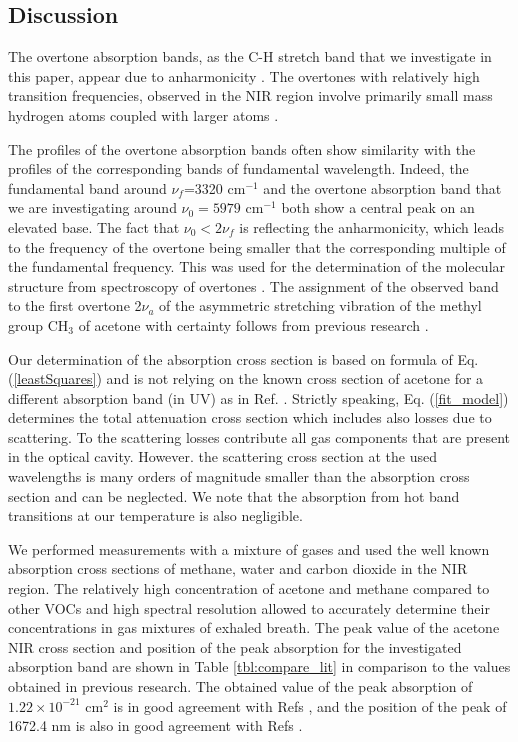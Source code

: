 \documentclass[8pt,a4paper]{report}
\begin{document}
	\subsection{Discussion}
	The overtone absorption bands, as the C-H stretch band that we investigate in this paper, appear due to anharmonicity \cite{Sandorfy_1978}. The overtones with relatively high transition frequencies, observed in the NIR region involve primarily small mass hydrogen atoms coupled with larger atoms \cite{Weyer_2006}.
	
	The profiles of the overtone absorption bands often show similarity with the profiles of the corresponding bands of fundamental wavelength. Indeed, the fundamental band \cite{Harrison_2011_3um} around $\nu_f$=3320 cm$^{-1}$ and the overtone absorption band that we are investigating around $\nu_0=5979$ cm$^{-1}$ both show a central peak on an elevated base. The fact that $\nu_0 < 2\nu_f$ is reflecting the  anharmonicity, which leads to the frequency of the overtone being smaller that the corresponding multiple of the fundamental frequency. This was used for the determination of the molecular structure from spectroscopy of overtones \cite{Henry_1987}. The assignment of the observed band to the first overtone 2$\nu_a$ of the asymmetric stretching vibration of the methyl group CH$_3$ of acetone with certainty follows from previous research \cite{Pearle_2008, Wang_2004, Hanazaki_1985}.
	
	Our determination of the absorption cross section is based on formula of Eq. (\ref{leastSquares}) and is not relying on the known cross section of acetone for a different absorption band (in UV) as in Ref. \cite{Pawel_2007}. Strictly speaking, Eq. (\ref{fit_model}) determines the total attenuation cross section which includes also losses due to scattering. To the scattering losses contribute all gas components that are present in the optical cavity. However. the scattering cross section at the used wavelengths is many orders of magnitude smaller than the absorption cross section \cite{Penndorf_1957} and can be neglected. We note that the absorption from hot band transitions \cite{Levine_2014_quantum_chem} at our temperature is also negligible.
	
	We performed measurements with a mixture of gases and used the well known absorption cross sections of methane, water and carbon dioxide in the NIR region. The relatively high concentration of acetone and methane compared to other VOCs and high spectral resolution allowed to accurately determine their concentrations in gas mixtures of exhaled breath. The peak value of the acetone NIR cross section and position of the peak absorption for the investigated absorption band are shown in Table \ref{tbl:compare_lit} in comparison to the values obtained in previous research.
	The obtained value of the peak absorption of $1.22\times10^{-21}\text{ cm}^2$ is in good agreement with Refs \cite{Pearle_2008, Wang_2004, Denzer_2010}, and the position of the peak of 1672.4 nm is also in good agreement with Refs \cite{pnnl_database_gas_phase,Pearle_2008}.
	
\end{document}
